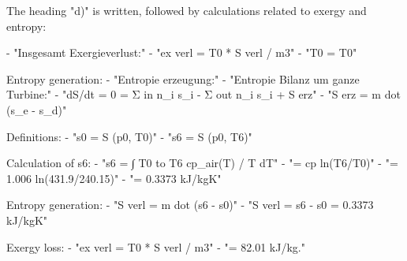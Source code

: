 The heading "d)" is written, followed by calculations related to exergy and entropy:  

- "Insgesamt Exergieverlust:"  
- "ex verl = T0 * S verl / m3"  
- "T0 = T0"  

Entropy generation:  
- "Entropie erzeugung:"  
- "Entropie Bilanz um ganze Turbine:"  
- "dS/dt = 0 = Σ in n_i s_i - Σ out n_i s_i + S erz"  
- "S erz = m dot (s_e - s_d)"  

Definitions:  
- "s0 = S (p0, T0)"  
- "s6 = S (p0, T6)"  

Calculation of s6:  
- "s6 = ∫ T0 to T6 cp_air(T) / T dT"  
- "= cp ln(T6/T0)"  
- "= 1.006 ln(431.9/240.15)"  
- "= 0.3373 kJ/kgK"  

Entropy generation:  
- "S verl = m dot (s6 - s0)"  
- "S verl = s6 - s0 = 0.3373 kJ/kgK"  

Exergy loss:  
- "ex verl = T0 * S verl / m3"  
- "= 82.01 kJ/kg."